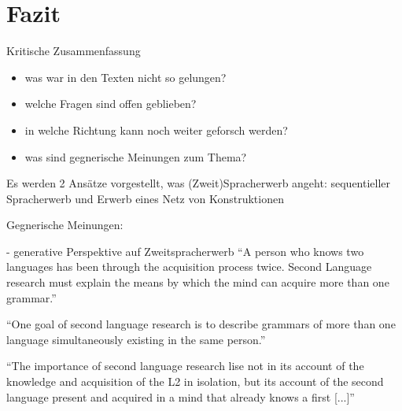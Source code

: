 \section{Fazit}

\begin{comment}
    * Einleitung und Fazit müssen zusammenpassen.
    * sind die Erkenntnisse im Fazit aus der Arbeit ableitbar?
    * Vorgehensweise zusammenfassen
\end{comment}

Kritische Zusammenfassung
\begin{itemize}
    \item was war in den Texten nicht so gelungen?
    \item welche Fragen sind offen geblieben?
    \item in welche Richtung kann noch weiter geforsch werden?
    \item was sind gegnerische Meinungen zum Thema?
\end{itemize}

Es werden 2 Ansätze vorgestellt, was (Zweit)Spracherwerb angeht: sequentieller Spracherwerb und Erwerb eines Netz von Konstruktionen

Gegnerische Meinungen:

\cite{Cook93} - generative Perspektive auf Zweitspracherwerb
``A person who knows two languages has been through the acquisition process twice.
Second Language research must explain the means by which the mind can acquire more than one grammar.''

``One goal of second language research is to describe grammars of more than one language simultaneously existing in the same person.''

``The importance of second language research lise not in its account of the knowledge and acquisition of the L2 in isolation, but its account of the second language present and acquired in a mind that already knows a first [...]''



